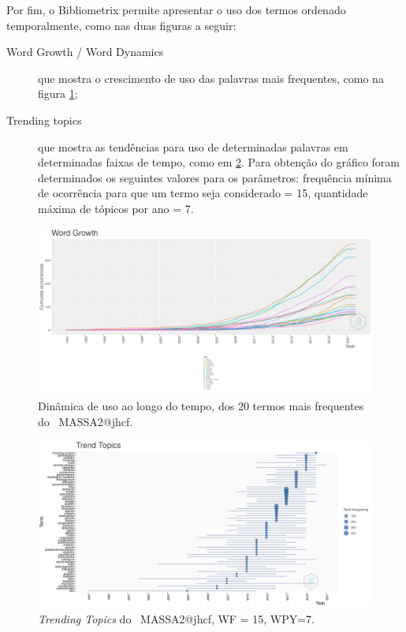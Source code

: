Por fim, o Bibliometrix permite apresentar o uso dos termos ordenado temporalmente, como nas duas figuras a seguir:
\begin{description}
    \item [Word Growth / Word Dynamics] que mostra o crescimento de uso das palavras mais frequentes, como na figura \ref{fig:MASSA2-WordDynamics};
    \item [Trending topics] que mostra as tendências para uso de determinadas palavras em determinadas faixas de tempo, como em \ref{fig:MASSA2-TrendTopics}. Para obtenção do gráfico foram determinados os seguintes valores para os parâmetros: frequência mínima de ocorrência para que um termo seja considerado = 15, quantidade máxima de tópicos por ano = 7.
\end{description}

\begin{figure}
    \centering
    \includegraphics[width=1\textwidth]{exploratory-data-analysis/jhcf/PesqBibliogr/SimulacaoMultiagente/WoS-20220203/Metricas/Documentos/MASSA2-WordDynamics.png}
    \caption{Dinâmica de uso ao longo do tempo, dos 20 termos mais frequentes do \dataset\ MASSA2@jhcf.}
    \label{fig:MASSA2-WordDynamics}
\end{figure}

\begin{figure}
    \centering
    \includegraphics[angle=90,width=1\textwidth,height=0.93\textheight]{exploratory-data-analysis/jhcf/PesqBibliogr/SimulacaoMultiagente/WoS-20220203/Metricas/Documentos/MASSA2-TrendTopics-WF=15-WPY=7.png}
    \caption{\textit{Trending Topics} do \dataset\ MASSA2@jhcf, WF = 15, WPY=7.}
    \label{fig:MASSA2-TrendTopics}
\end{figure}

